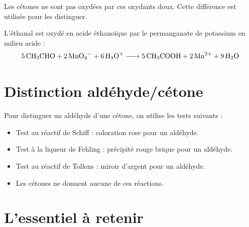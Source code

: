 \begin{remarque}
Les cétones ne sont pas oxydées par ces oxydants doux. Cette différence est utilisée pour les distinguer.
\end{remarque}

\begin{exemple}
L'éthanal  est oxydé en acide éthanoïque  par le permanganate de potassium en milieu acide :
\[
\ce{5 CH3CHO + 2 MnO4- + 6 H3O+ -> 5 CH3COOH + 2 Mn^2+ + 9 H2O}
\]
\end{exemple}

\section{Distinction aldéhyde/cétone}

\begin{aretenir}
Pour distinguer un aldéhyde d'une cétone, on utilise les tests suivants :
\begin{itemize}
    \item Test au réactif de Schiff : coloration rose pour un aldéhyde.
    \item Test à la liqueur de Fehling : précipité rouge brique pour un aldéhyde.
    \item Test au réactif de Tollens : miroir d'argent pour un aldéhyde.
    \item Les cétones ne donnent aucune de ces réactions.
\end{itemize}
\end{aretenir}

\section{L'essentiel à retenir}

